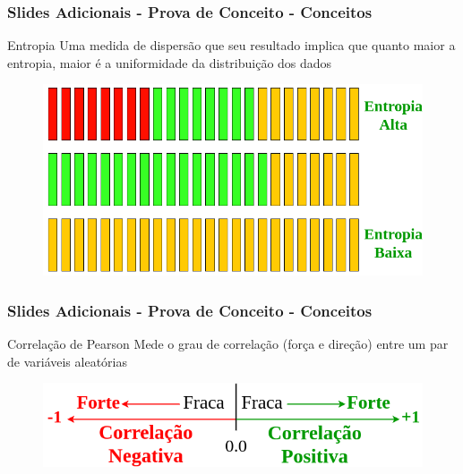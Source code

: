 
\begin{frame}
\frametitle{Slides Adicionais - Prova de Conceito - Conceitos}
\begin{block}{Entropia}
Uma medida de dispers\~ao que seu resultado implica que quanto maior a entropia, maior \'e a uniformidade da distribui\c{c}\~ao dos dados 
\end{block}
\begin{figure}
\centering
\includegraphics[scale=0.35]{figuras/entropiaSBIE.png}
\end{figure}
\end{frame}

\begin{frame}
\frametitle{Slides Adicionais - Prova de Conceito - Conceitos}
\begin{block}{Correla\c{c}\~ao de Pearson}
Mede o grau de correla\c{c}\~ao (for\c{c}a e dire\c{c}\~ao) entre um par de vari\'aveis aleat\'orias
\end{block}
\begin{figure}
\centering
\includegraphics[scale=0.4]{figuras/pearson.png}
\end{figure}

\end{frame}



